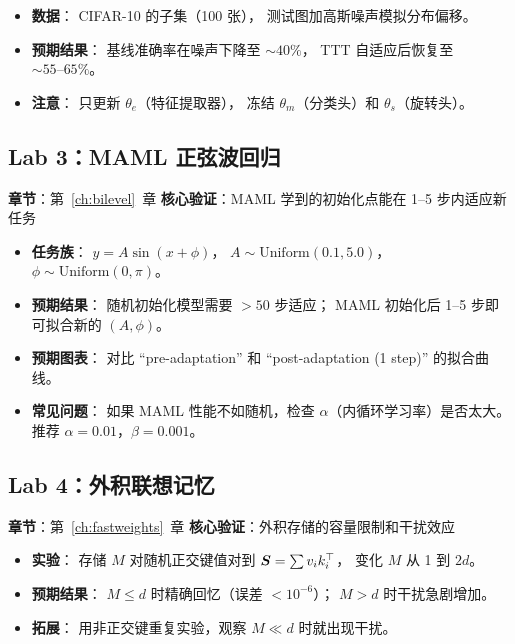 \begin{itemize}
  \item \textbf{数据}：
    CIFAR-10 的子集（100 张），
    测试图加高斯噪声模拟分布偏移。

  \item \textbf{预期结果}：
    基线准确率在噪声下降至 $\sim 40\%$，
    TTT 自适应后恢复至 $\sim 55\text{--}65\%$。

  \item \textbf{注意}：
    只更新 $\theta_e$（特征提取器），
    冻结 $\theta_m$（分类头）和 $\theta_s$（旋转头）。
\end{itemize}

\subsection{Lab 3：MAML 正弦波回归}

\textbf{章节}：第~\ref{ch:bilevel}~章 \quad
\textbf{核心验证}：MAML 学到的初始化点能在 1--5 步内适应新任务

\begin{itemize}
  \item \textbf{任务族}：
    $y = A \sin(x + \phi)$，
    $A \sim \text{Uniform}(0.1, 5.0)$，
    $\phi \sim \text{Uniform}(0, \pi)$。

  \item \textbf{预期结果}：
    随机初始化模型需要 $>50$ 步适应；
    MAML 初始化后 1--5 步即可拟合新的 $(A, \phi)$。

  \item \textbf{预期图表}：
    对比 ``pre-adaptation'' 和 ``post-adaptation (1 step)'' 的拟合曲线。

  \item \textbf{常见问题}：
    如果 MAML 性能不如随机，检查 $\alpha$（内循环学习率）是否太大。
    推荐 $\alpha = 0.01$，$\beta = 0.001$。
\end{itemize}

\subsection{Lab 4：外积联想记忆}

\textbf{章节}：第~\ref{ch:fastweights}~章 \quad
\textbf{核心验证}：外积存储的容量限制和干扰效应

\begin{itemize}
  \item \textbf{实验}：
    存储 $M$ 对随机正交键值对到 $\boldsymbol{S} = \sum v_i k_i^\top$，
    变化 $M$ 从 1 到 $2d$。

  \item \textbf{预期结果}：
    $M \leq d$ 时精确回忆（误差 $< 10^{-6}$）；
    $M > d$ 时干扰急剧增加。

  \item \textbf{拓展}：
    用非正交键重复实验，观察 $M \ll d$ 时就出现干扰。
\end{itemize}

